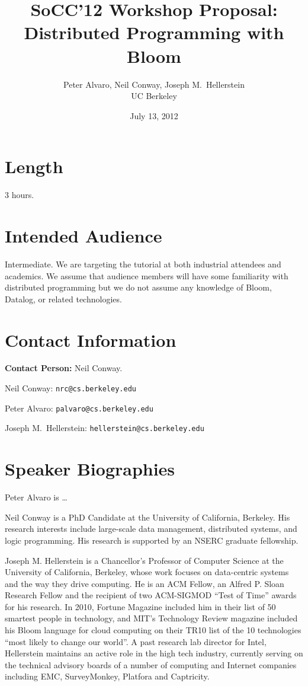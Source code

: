 \documentclass[11pt]{article}
\title{SoCC'12 Workshop Proposal:\\Distributed Programming with Bloom}
\author{Peter Alvaro, Neil Conway, Joseph M.\ Hellerstein\\UC Berkeley}
\date{July 13, 2012}
\begin{document}
\maketitle

\section*{Length}

3 hours.

\section*{Intended Audience}

Intermediate. We are targeting the tutorial at both industrial attendees and
academics. We assume that audience members will have some familiarity with
distributed programming but we do not assume any knowledge of Bloom, Datalog, or
related technologies.

\section*{Contact Information}

\textbf{Contact Person:} Neil Conway.

\bigskip

\noindent{}Neil Conway: \texttt{nrc@cs.berkeley.edu}

\noindent{}Peter Alvaro: \texttt{palvaro@cs.berkeley.edu}

\noindent{}Joseph M.\ Hellerstein: \texttt{hellerstein@cs.berkeley.edu}

\section*{Speaker Biographies}

Peter Alvaro is \ldots

Neil Conway is a PhD Candidate at the University of California, Berkeley. His
research interests include large-scale data management, distributed systems,
and logic programming. His research is supported by an NSERC graduate
fellowship.

Joseph M. Hellerstein is a Chancellor's Professor of Computer Science at the
University of California, Berkeley, whose work focuses on data-centric systems
and the way they drive computing. He is an ACM Fellow, an Alfred P. Sloan
Research Fellow and the recipient of two ACM-SIGMOD ``Test of Time'' awards for
his research. In 2010, Fortune Magazine included him in their list of 50
smartest people in technology, and MIT's Technology Review magazine included his
Bloom language for cloud computing on their TR10 list of the 10 technologies
``most likely to change our world''. A past research lab director for Intel,
Hellerstein maintains an active role in the high tech industry, currently
serving on the technical advisory boards of a number of computing and Internet
companies including EMC, SurveyMonkey, Platfora and Captricity.
\end{document}
